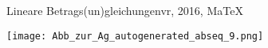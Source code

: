 \begin{MAufgabe}{Lineare Betrags(un)gleichungen}{vr, 2016, MaTeX}
 \begin{center}
 \texttt{[image: Abb\_zur\_Ag\_autogenerated\_abseq\_9.png]} \end{center}
 
\else\relax\fi
 \end{MAufgabe}